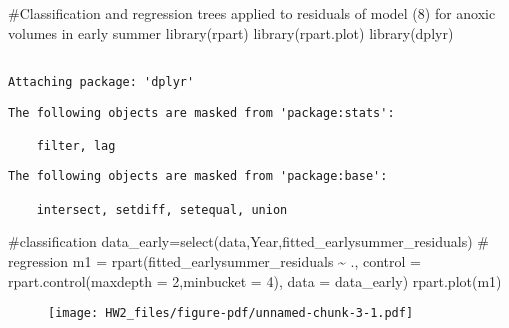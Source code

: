 \documentclass[
  letterpaper,
  DIV=11,
  numbers=noendperiod]{scrartcl}
\newenvironment{Shaded}{\begin{snugshade}}{\end{snugshade}}
\newcommand{\AttributeTok}[1]{\textcolor[rgb]{0.40,0.45,0.13}{#1}}
\newcommand{\CommentTok}[1]{\textcolor[rgb]{0.37,0.37,0.37}{#1}}
\newcommand{\DecValTok}[1]{\textcolor[rgb]{0.68,0.00,0.00}{#1}}
\newcommand{\FunctionTok}[1]{\textcolor[rgb]{0.28,0.35,0.67}{#1}}
\newcommand{\NormalTok}[1]{\textcolor[rgb]{0.00,0.23,0.31}{#1}}
\newcommand{\OtherTok}[1]{\textcolor[rgb]{0.00,0.23,0.31}{#1}}
\newcommand{\SpecialCharTok}[1]{\textcolor[rgb]{0.37,0.37,0.37}{#1}}
\begin{document}
\begin{Shaded}
\begin{Highlighting}[]
\CommentTok{\#Classification and regression trees applied to residuals of model (8) for anoxic volumes in early summer}
\FunctionTok{library}\NormalTok{(rpart)}
\FunctionTok{library}\NormalTok{(rpart.plot)}
\FunctionTok{library}\NormalTok{(dplyr)}
\end{Highlighting}
\end{Shaded}

\begin{verbatim}

Attaching package: 'dplyr'
\end{verbatim}

\begin{verbatim}
The following objects are masked from 'package:stats':

    filter, lag
\end{verbatim}

\begin{verbatim}
The following objects are masked from 'package:base':

    intersect, setdiff, setequal, union
\end{verbatim}

\begin{Shaded}
\begin{Highlighting}[]
\CommentTok{\#classification}
\NormalTok{data\_early}\OtherTok{=}\FunctionTok{select}\NormalTok{(data,Year,fitted\_earlysummer\_residuals)}
\CommentTok{\# regression}
\NormalTok{m1 }\OtherTok{=} \FunctionTok{rpart}\NormalTok{(fitted\_earlysummer\_residuals }\SpecialCharTok{\textasciitilde{}}\NormalTok{ ., }
           \AttributeTok{control =} \FunctionTok{rpart.control}\NormalTok{(}\AttributeTok{maxdepth =} \DecValTok{2}\NormalTok{,}\AttributeTok{minbucket =} \DecValTok{4}\NormalTok{),}
           \AttributeTok{data =}\NormalTok{ data\_early)}
\FunctionTok{rpart.plot}\NormalTok{(m1)}
\end{Highlighting}
\end{Shaded}

\begin{figure}[H]

{\centering \texttt{[image: HW2\_files/figure-pdf/unnamed-chunk-3-1.pdf]}

}

\end{figure}
\end{document}
